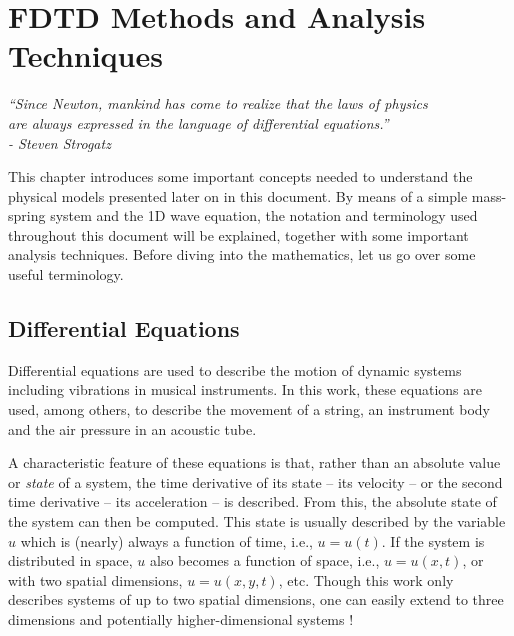 \chapter{FDTD Methods and Analysis Techniques}\label{ch:FDTD}

\begin{flushright}{\it
``Since Newton, mankind has come to realize that the laws of physics\\
are always expressed in the language of differential equations.''\\
- Steven Strogatz} %
\end{flushright}
%
\vspace{2em}
This chapter introduces some important concepts needed to understand the physical models presented later on in this document. 
By means of a simple mass-spring system and the 1D wave equation, the notation and terminology used throughout this document will be explained, together with some important analysis techniques. 
Before diving into the mathematics, let us go over some useful terminology.

\section{Differential Equations}
Differential equations are used to describe the motion of dynamic systems including vibrations in musical instruments. In this work, these equations are used, among others, to describe the movement of a string, an instrument body and the air pressure in an acoustic tube.

A characteristic feature of these equations is that, rather than an absolute value or \textit{state} of a system, the time derivative of its state -- its velocity -- or the second time derivative -- its acceleration -- is described. From this, the absolute state of the system can then be computed.
%
This state is usually described by the variable $u$ which is (nearly) always a function of time, i.e., $u=u(t)$. If the system is distributed in space, $u$ also becomes a function of space, i.e., $u = u(x,t)$, or with two spatial dimensions, $u = u(x,y,t)$, etc. Though this work only describes systems of up to two spatial dimensions, one can easily extend to three dimensions \cite{Hamilton2016} and potentially higher-dimensional systems \cite{Bustamante2017}! 

